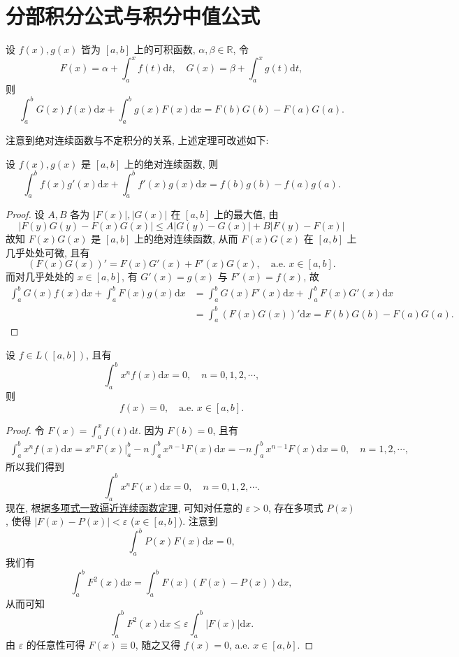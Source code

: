 \documentclass[../../main.tex]{subfiles}%
\begin{document}
\section{分部积分公式与积分中值公式}

\begin{theorem}[分部积分公式]\label{theorem:实变函数--分部积分公式}
设 $f(x),g(x)$ 皆为 $[a,b]$ 上的可积函数, $\alpha,\beta\in\mathbb{R}$, 令
\[
F(x) = \alpha + \int_a^x f(t)\mathrm{d}t,\quad G(x) = \beta + \int_a^x g(t)\mathrm{d}t,
\]
则
\[
\int_a^b G(x)f(x)\mathrm{d}x + \int_a^b g(x)F(x)\mathrm{d}x = F(b)G(b) - F(a)G(a). \tag{5.13}
\]
\end{theorem}
\begin{remark}
注意到绝对连续函数与不定积分的关系, 上述定理可改述如下:

设 $f(x),g(x)$ 是 $[a,b]$ 上的绝对连续函数, 则
\[
\int_a^b f(x)g'(x)\mathrm{d}x + \int_a^b f'(x)g(x)\mathrm{d}x = f(b)g(b) - f(a)g(a).
\]
\end{remark}
\begin{proof}

设 $A,B$ 各为 $|F(x)|,|G(x)|$ 在 $[a,b]$ 上的最大值, 由
\[
|F(y)G(y)-F(x)G(x)| \leqslant A|G(y)-G(x)| + B|F(y)-F(x)|
\]
故知 $F(x)G(x)$ 是 $[a,b]$ 上的绝对连续函数, 从而 $F(x)G(x)$ 在 $[a,b]$ 上几乎处处可微, 且有
\[
(F(x)G(x))' = F(x)G'(x) + F'(x)G(x),\quad \text{a.e. } x\in[a,b].
\]
而对几乎处处的 $x\in[a,b]$, 有 $G'(x)=g(x)$ 与 $F'(x)=f(x)$, 故
\begin{align*}
\int_a^b G(x)f(x)\mathrm{d}x + \int_a^b F(x)g(x)\mathrm{d}x
&= \int_a^b G(x)F'(x)\mathrm{d}x + \int_a^b F(x)G'(x)\mathrm{d}x \\
&= \int_a^b (F(x)G(x))'\mathrm{d}x = F(b)G(b) - F(a)G(a).
\end{align*}

\end{proof}

\begin{example}
设 $f\in L([a,b])$, 且有
\[
\int_a^b x^n f(x)\mathrm{d}x = 0,\quad n=0,1,2,\cdots,
\]
则
\[
f(x)=0,\quad \text{a.e. } x\in[a,b].
\]
\end{example}
\begin{proof}

令 $F(x) = \int_a^x f(t)\mathrm{d}t$. 因为 $F(b)=0$, 且有
\begin{align*}
\int_a^b x^n f(x)\mathrm{d}x = x^n F(x)\Big|_a^b - n\int_a^b x^{n-1}F(x)\mathrm{d}x 
= -n\int_a^b x^{n-1}F(x)\mathrm{d}x = 0,\quad n=1,2,\cdots,
\end{align*}
所以我们得到
\[
\int_a^b x^n F(x)\mathrm{d}x = 0,\quad n=0,1,2,\cdots.
\]
现在, 根据\hyperref[Basis-of-Analytics-theorem:多项式逼近有限阶光滑函数]{多项式一致逼近连续函数定理}, 可知对任意的 $\varepsilon>0$, 存在多项式 $P(x)$, 使得 $|F(x)-P(x)|<\varepsilon$ ($x\in[a,b]$). 注意到
\[
\int_a^b P(x)F(x)\mathrm{d}x = 0,
\]
我们有
\[
\int_a^b F^2(x)\mathrm{d}x = \int_a^b F(x)(F(x)-P(x))\mathrm{d}x,
\]
从而可知
\[
\int_a^b F^2(x)\mathrm{d}x \leqslant \varepsilon\int_a^b |F(x)|\mathrm{d}x.
\]
由 $\varepsilon$ 的任意性可得 $F(x)\equiv 0$, 随之又得 $f(x)=0$, a.e. $x\in[a,b]$.

\end{proof}
\end{document}
